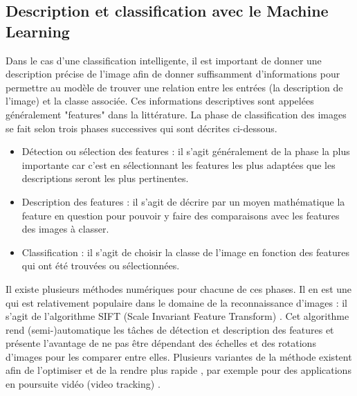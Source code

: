 \documentclass[a4paper, 11pt]{article}
\begin{document}
		\subsection*{Description et classification avec le Machine Learning}
		Dans le cas d'une classification intelligente, il est important de donner une description précise de l'image afin de donner suffisamment d'informations pour permettre au modèle de trouver une relation entre les entrées (la description de l'image) et la classe associée. Ces informations descriptives sont appelées généralement "features" dans la littérature. La phase de classification des images se fait selon trois phases successives qui sont décrites ci-dessous.
		\begin{itemize}[label=$\rightarrow$]
			\item Détection ou sélection des features : il s'agit généralement de la phase la plus importante car c'est en sélectionnant les features les plus adaptées que les descriptions seront les plus pertinentes.
			\item Description des features : il s'agit de décrire par un moyen mathématique la feature en question pour pouvoir y faire des comparaisons avec les features des images à classer.
			\item Classification : il s'agit de choisir la classe de l'image en fonction des features qui ont été trouvées ou sélectionnées.
		\end{itemize}
		Il existe plusieurs méthodes numériques pour chacune de ces phases. Il en est une qui est relativement populaire dans le domaine de la reconnaissance d'images : il s'agit de l'algorithme SIFT (Scale Invariant Feature Transform) \cite{lowe1999object}. Cet algorithme rend (semi-)automatique les tâches de détection et description des features et présente l'avantage de ne pas être dépendant des échelles et des rotations d'images pour les comparer entre elles. Plusieurs variantes de la méthode existent afin de l'optimiser et de la rendre plus rapide \cite{liu2013image, wu2013comparative}, par exemple pour des applications en poursuite vidéo (video tracking) \cite{hu2008video}.
\end{document}
